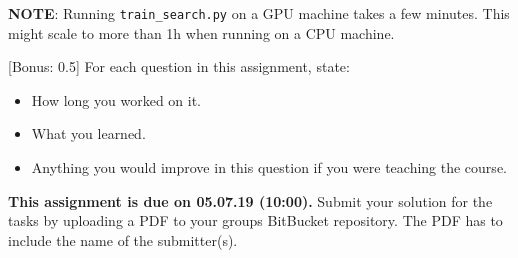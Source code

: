 \documentclass{exam}
\newcommand{\duedate}{05.07.19 (10:00)}
\newcommand{\due}{{\bf This assignment is due on \duedate.} }
\begin{document}
\begin{questions}
\begin{parts}
		\textbf{NOTE}: Running \texttt{train\_search.py} on a GPU machine takes a few minutes. This might scale to more than 1h when running on a CPU machine.

		\end{parts}

		[Bonus: 0.5]
		For each question in this assignment, state:
		\begin{itemize}
			\item How long you worked on it.
			\item What you learned.
			\item Anything you would improve in this question if you were teaching the course.
		\end{itemize}
	\end{questions}
	
	\noindent
	\due Submit your solution for the tasks by uploading a PDF to your groups BitBucket repository. The PDF has to include the name of the submitter(s).
\end{document}
